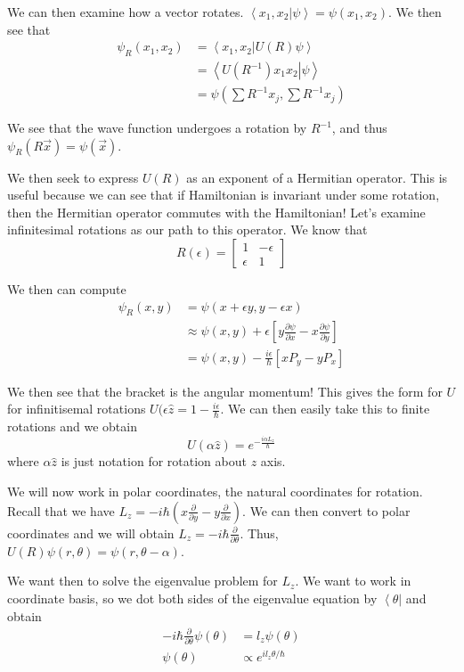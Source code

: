 \documentclass[10pt]{report}
\newcommand{\bra}[1]{\left<#1\right|}
\newcommand{\dotp}[2]{\left<#1\left.\right|#2\right>}
\newcommand{\pd}[2]{\frac{\partial #1}{\partial#2}}
\begin{document}
We can then examine how a vector rotates. $\dotp{x_1, x_2}{\psi} = \psi(x_1, x_2)$. We then see that
\begin{align}
	\psi_R(x_1, x_2) &= \dotp{x_1, x_2}{U(R)\psi} \\
	&= \dotp{U(R^{-1})x_1x_2}{\psi}\\
	&= \psi(\sum R^{-1}x_j, \sum R^{-1}x_j)
\end{align}

We see that the wave function undergoes a rotation by $R^{-1}$, and thus $\psi_R(R\vec{x}) = \psi(\vec{x})$. 

We then seek to express $U(R)$ as an exponent of a Hermitian operator. This is useful because we can see that if Hamiltonian is invariant under some rotation, then the Hermitian operator commutes with the Hamiltonian! Let's examine infinitesimal rotations as our path to this operator. We know that
$$R(\epsilon) = \begin{bmatrix}1 & -\epsilon \\ \epsilon & 1\end{bmatrix}$$

We then can compute 
\begin{align}
	\psi_R(x,y) &= \psi(x + \epsilon y, y-\epsilon x)\\
	&\approx \psi(x,y) + \epsilon\left[ y\pd{\psi}{x} - x\pd{\psi}{y} \right]\\
	&= \psi(x,y) - \frac{i\epsilon}{\hbar}\left[ xP_y - yP_x \right]
\end{align}

We then see that the bracket is the angular momentum! This gives the form for $U$ for infinitisemal rotations $U(\epsilon\hat{z} = 1-\frac{i\epsilon}{\hbar}$. We can then easily take this to finite rotations and we obtain
$$U(\alpha \hat{z}) = e^{-\frac{i\alpha L_z}{\hbar}}$$
where $\alpha \hat{z}$ is just notation for rotation about $z$ axis.

We will now work in polar coordinates, the natural coordinates for rotation. Recall that we have $L_z = -i\hbar\left( x\pd{}{y} - y\pd{}{x} \right)$. We can then convert to polar coordinates and we will obtain $L_z = -i\hbar \pd{}{\theta}$. Thus, $U(R) \psi(r,\theta) = \psi(r,\theta-\alpha)$.

We want then to solve the eigenvalue problem for $L_z$. We want to work in coordinate basis, so we dot both sides of the eigenvalue equation by $\bra{\theta}$ and obtain
\begin{align}
	-i\hbar \pd{}{\theta} \psi(\theta) &= l_z \psi(\theta)\\
	\psi(\theta) &\propto e^{il_z\theta/\hbar}
\end{align}
\end{document}
